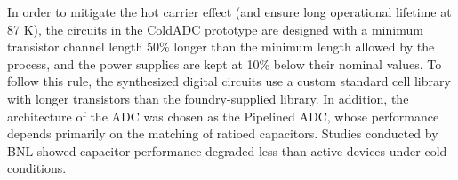 In order to mitigate the hot carrier effect (and ensure long operational lifetime at 87 K), the circuits in the ColdADC prototype
are designed with a minimum transistor channel 
length 50\% longer than the minimum length allowed by the process, and the power supplies are kept at 10\% below their nominal 
values. To follow this rule, the synthesized digital circuits use a custom standard cell library with longer 
transistors than the foundry-supplied library. In addition, the architecture of the ADC was chosen as the Pipelined ADC, whose 
performance depends primarily on the matching of ratioed capacitors. Studies conducted by BNL showed capacitor performance 
degraded less than active devices under cold conditions. 
